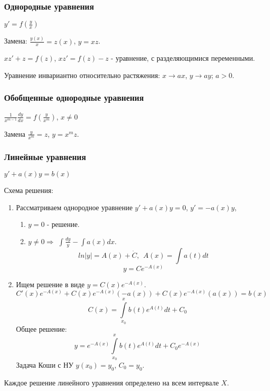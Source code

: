  \subsubsection{Однородные уравнения}
  $\boxed{ y' = f\left(\frac{y}{x}\right) }$
  
  \noindent Замена: $\frac{y(x)}{x} = z(x)$, $y = xz$. 
  
  \noindent $ xz' + z = f(z) $, $xz' = f(z) - z $ - уравнение, с разделяющимися переменными.
  
  \begin{ntc}
  Уравнение инвариантно относительно растяжения: $ x \rightarrow ax $, $ y \rightarrow ay $; $ a > 0 $.
  \end{ntc}
  
  \subsubsection{Обобщенные однородные уравнения}
  $\boxed{ \frac{1}{x^{m - 1}}\frac{dy}{dx} = f \left(\frac{y}{x^m}\right) }$, $ x \neq 0 $
  
  \noindent Замена $\frac{y}{x^m} = z$, $y = x^m z$.
  
  \subsubsection{Линейные уравнения}
  $\boxed{ y' + a(x)y = b(x) }$
  
  \noindent Схема решения:
  \begin{enumerate}
  \item Рассматриваем однородное уравнение $y' + a(x)y = 0$, $y' = -a(x)y$,
    \begin{enumerate}
    \item $y = 0$ - решение.
    \item $y \neq 0 \Rightarrow$ $\int \frac{dy}{y} -\int a(x)dx$.
    $$ ln|y| = A(x) + \dot{C},~~ A(x) = \int a(t)dt $$
    $$ y = Ce^{-A(x)} $$
    \end{enumerate}
    \item Ищем решение в виде $ y = C(x)e^{-A(x)} $.
    $$ C'(x)e^{-A(x)} + C(x)e^{-A(x)}\left(-a(x)\right) + C(x)e^{-A(x)}\left(a(x)\right) = b(x) $$
    $$ C(x) = \int\limits_{x_0}^{x} b(t)e^{A(t)}dt + C_0 $$
    Общее решение:
    $$ y = e^{-A(x)} \int\limits_{x_0}^{x}b(t)e^{A(t)}dt + C_0e^{-A(x)} $$
    Задача Коши с НУ $y(x_0) = y_0$, $C_0 = y_0$.
  \end{enumerate}
  Каждое решение линейного уравнения определено на всем интервале $X$.
  
